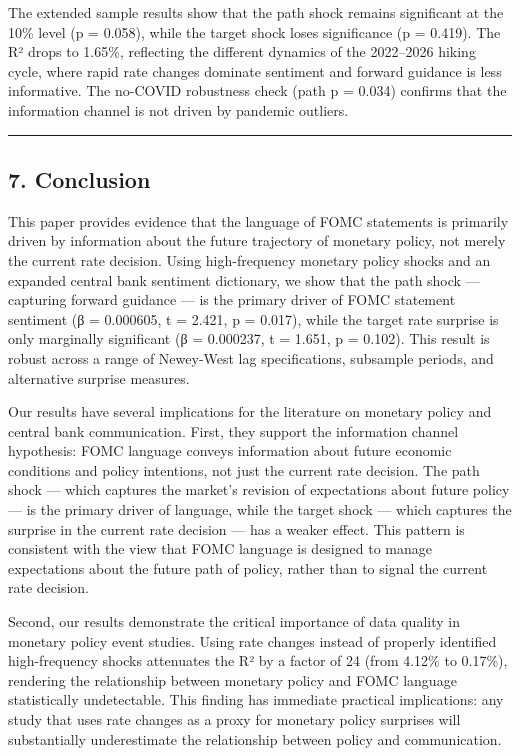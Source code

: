 \documentclass[
]{article}
\begin{document}
The extended sample results show that the path shock remains significant
at the 10\% level (p = 0.058), while the target shock loses significance
(p = 0.419). The R² drops to 1.65\%, reflecting the different dynamics
of the 2022--2026 hiking cycle, where rapid rate changes dominate
sentiment and forward guidance is less informative. The no-COVID
robustness check (path p = 0.034) confirms that the information channel
is not driven by pandemic outliers.

\begin{center}\rule{0.5\linewidth}{0.5pt}\end{center}

\subsection{7. Conclusion}\label{conclusion}

This paper provides evidence that the language of FOMC statements is
primarily driven by information about the future trajectory of monetary
policy, not merely the current rate decision. Using high-frequency
monetary policy shocks and an expanded central bank sentiment
dictionary, we show that the path shock --- capturing forward guidance
--- is the primary driver of FOMC statement sentiment (β = 0.000605, t =
2.421, p = 0.017), while the target rate surprise is only marginally
significant (β = 0.000237, t = 1.651, p = 0.102). This result is robust
across a range of Newey-West lag specifications, subsample periods, and
alternative surprise measures.

Our results have several implications for the literature on monetary
policy and central bank communication. First, they support the
information channel hypothesis: FOMC language conveys information about
future economic conditions and policy intentions, not just the current
rate decision. The path shock --- which captures the market's revision
of expectations about future policy --- is the primary driver of
language, while the target shock --- which captures the surprise in the
current rate decision --- has a weaker effect. This pattern is
consistent with the view that FOMC language is designed to manage
expectations about the future path of policy, rather than to signal the
current rate decision.

Second, our results demonstrate the critical importance of data quality
in monetary policy event studies. Using rate changes instead of properly
identified high-frequency shocks attenuates the R² by a factor of 24
(from 4.12\% to 0.17\%), rendering the relationship between monetary
policy and FOMC language statistically undetectable. This finding has
immediate practical implications: any study that uses rate changes as a
proxy for monetary policy surprises will substantially underestimate the
relationship between policy and communication.
\end{document}
